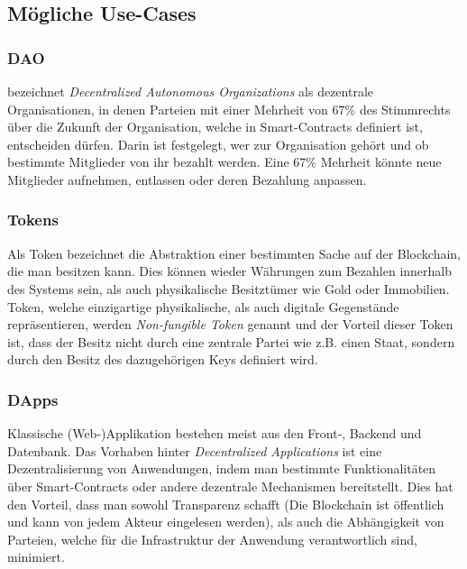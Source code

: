 \subsection{Mögliche Use-Cases}
\subsubsection{DAO}
\cite{buterin_whitepaper_2013} bezeichnet \emph{Decentralized Autonomous Organizations} als dezentrale Organisationen, in denen Parteien mit einer Mehrheit von 67\% des Stimmrechts über die Zukunft der Organisation, welche in Smart-Contracts definiert ist, entscheiden dürfen. Darin ist festgelegt, wer zur Organisation gehört und ob bestimmte Mitglieder von ihr bezahlt werden. Eine 67\% Mehrheit könnte neue Mitglieder aufnehmen, entlassen oder deren Bezahlung anpassen.
\subsubsection{Tokens}
Als Token bezeichnet \cite{antanopoulos_2018} die Abstraktion einer bestimmten Sache auf der Blockchain, die man besitzen kann. Dies können wieder Währungen zum Bezahlen innerhalb des Systems sein, als auch physikalische Besitztümer wie Gold oder Immobilien. Token, welche einzigartige physikalische, als auch digitale Gegenstände repräsentieren, werden \emph{Non-fungible Token} genannt und der Vorteil dieser Token ist, dass der Besitz nicht durch eine zentrale Partei wie z.B. einen Staat, sondern durch den Besitz des dazugehörigen Keys  definiert wird.
\subsubsection{DApps}
Klassische (Web-)Applikation bestehen meist aus den Front-, Backend und Datenbank. Das Vorhaben hinter \emph{Decentralized Applications} ist eine Dezentralisierung von Anwendungen, indem man bestimmte Funktionalitäten über Smart-Contracts oder andere dezentrale Mechanismen bereitstellt. Dies hat den Vorteil, dass man sowohl Transparenz schafft (Die Blockchain ist öffentlich und kann von jedem Akteur eingelesen werden), als auch die Abhängigkeit von Parteien, welche für die Infrastruktur der Anwendung verantwortlich sind, minimiert.